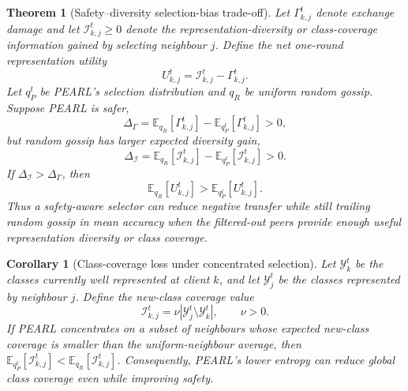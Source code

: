 \documentclass[conference]{IEEEtran}
\newtheorem{theorem}{Theorem}
\newtheorem{corollary}{Corollary}
\begin{document}
\begin{theorem}[Safety--diversity selection-bias trade-off]
\label{thm:safety_diversity_tradeoff}
Let \(\Gamma_{k,j}^t\) denote exchange damage and let \(\mathcal{I}_{k,j}^t\geq0\) denote the representation-diversity or class-coverage information gained by selecting neighbour \(j\). Define the net one-round representation utility
\begin{equation*}
U_{k,j}^t
=
\mathcal{I}_{k,j}^t-\Gamma_{k,j}^t .
\end{equation*}
Let \(q_P^t\) be PEARL's selection distribution and \(q_R\) be uniform random gossip. Suppose PEARL is safer,
\begin{equation*}
\Delta_{\Gamma}
=
\mathbb{E}_{q_R}[\Gamma_{k,j}^t]
-
\mathbb{E}_{q_P^t}[\Gamma_{k,j}^t]
>0,
\end{equation*}
but random gossip has larger expected diversity gain,
\begin{equation*}
\Delta_{\mathcal{I}}
=
\mathbb{E}_{q_R}[\mathcal{I}_{k,j}^t]
-
\mathbb{E}_{q_P^t}[\mathcal{I}_{k,j}^t]
>0.
\end{equation*}
If \(\Delta_{\mathcal{I}}>\Delta_{\Gamma}\), then
\begin{equation*}
\mathbb{E}_{q_R}[U_{k,j}^t]
>
\mathbb{E}_{q_P^t}[U_{k,j}^t].
\end{equation*}
Thus a safety-aware selector can reduce negative transfer while still trailing random gossip in mean accuracy when the filtered-out peers provide enough useful representation diversity or class coverage.
\end{theorem}

\begin{corollary}[Class-coverage loss under concentrated selection]
\label{cor:class_coverage_selection_bias}
Let \(\mathcal{Y}_k^t\) be the classes currently well represented at client \(k\), and let \(\mathcal{Y}_j^t\) be the classes represented by neighbour \(j\). Define the new-class coverage value
\begin{equation*}
\mathcal{I}_{k,j}^t
=
\nu\left|
\mathcal{Y}_j^t\setminus\mathcal{Y}_k^t
\right|,
\qquad
\nu>0 .
\end{equation*}
If PEARL concentrates on a subset of neighbours whose expected new-class coverage is smaller than the uniform-neighbour average, then \(\mathbb{E}_{q_P^t}[\mathcal{I}_{k,j}^t]<\mathbb{E}_{q_R}[\mathcal{I}_{k,j}^t]\). Consequently, PEARL's lower entropy can reduce global class coverage even while improving safety.
\end{corollary}
\end{document}
